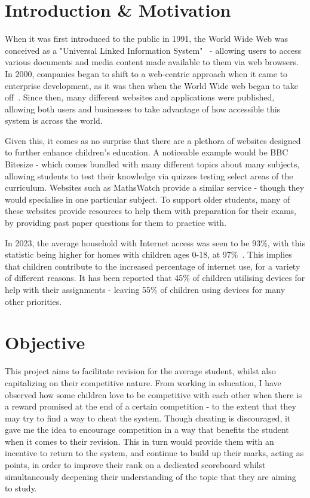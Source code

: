 \documentclass[]{final_report}
\begin{document}
\section{Introduction \& Motivation}

When it was first introduced to the public in 1991, the World Wide Web was conceived as a "Universal Linked Information System"~\cite{TBL_WWW} - allowing users to access various documents and media content made available to them via web browsers. In 2000, companies began to shift to a web-centric approach when it came to enterprise development, as it was then when the World Wide web began to take off~\cite{MODERN_WEB}. Since then, many different websites and applications were published, allowing both users and businesses to take advantage of how accessible this system is across the world.

Given this, it comes as no surprise that there are a plethora of websites designed to further enhance children's education. A noticeable example would be BBC Bitesize - which comes bundled with many different topics about many subjects, allowing students to test their knowledge via quizzes testing select areas of the curriculum. Websites such as MathsWatch provide a similar service - though they would specialise in one particular subject. To support older students, many of these websites provide resources to help them with preparation for their exams, by providing past paper questions for them to practice with.

In 2023, the average household with Internet access was seen to be 93\%, with this statistic being higher for homes with children ages 0-18, at 97\%~\cite{INTERNET_USERS}. This implies that children contribute to the increased percentage of internet use, for a variety of different reasons. It has been reported that 45\% of children utilising devices for help with their assignments\cite{DEVICE_REPORT} - leaving 55\% of children using devices for many other priorities.
\section{Objective}
This project aims to facilitate revision for the average student, whilst also capitalizing on their competitive nature.  From working in education, I have observed how some children love to be competitive with each other when there is a reward promised at the end of a certain competition - to the extent that they may try to find a way to cheat the system. Though cheating is discouraged, it gave me the idea to encourage competition in a way that benefits the student when it comes to their revision. This in turn would provide them with an incentive to return to the system, and continue to build up their marks, acting as points, in order to improve their rank on a dedicated scoreboard whilst simultaneously deepening their understanding of the topic that they are aiming to study.
\end{document}
